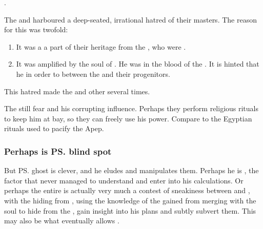 \Nexagglachel {}. 

The \satharioth{} and \ketherain{} harboured a deep-seated, irrational hatred of their \bane{} masters. 
The reason for this was twofold:

\begin{enumerate}
  \item 
    It was a a part of their heritage from the \banes, who were . 
  \item
    It was amplified by the soul of \Nexagglachel. 
    He was  in the blood of the \satharioth. 
    It is hinted that he  in order to  between the \resphain{} and their \bane{} progenitors.
\end{enumerate}

This hatred made the \satharioth{}  and other \resphain{} several times. 

The \resphain{} still fear \Nexagglachel{} and his corrupting influence. 
Perhaps they perform religious rituals to keep him at bay, so they can freely use his power. 
Compare to the Egyptian rituals used to pacify the \dragon{} Apep.





\subsubsection{Perhaps \Nexagglachel{} is \ps{\Daggerrain}{} blind spot}
But \ps{\Nexagglachel}{} ghost is clever, and he eludes and manipulates them. 
Perhaps he is , the factor that \Daggerrain{} never managed to understand and enter into his calculations. 
Or perhaps the entire \feud{} is actually very much a contest of sneakiness between \Nexagglachel{} and \Daggerrain, with the \dragonlord{} hiding from \Daggerrain, using the knowledge of the \banes{} gained from merging with the \resphan{} soul to hide from the \banelord{}, gain insight into his plans and subtly subvert them. 
This may also be what eventually allows .





